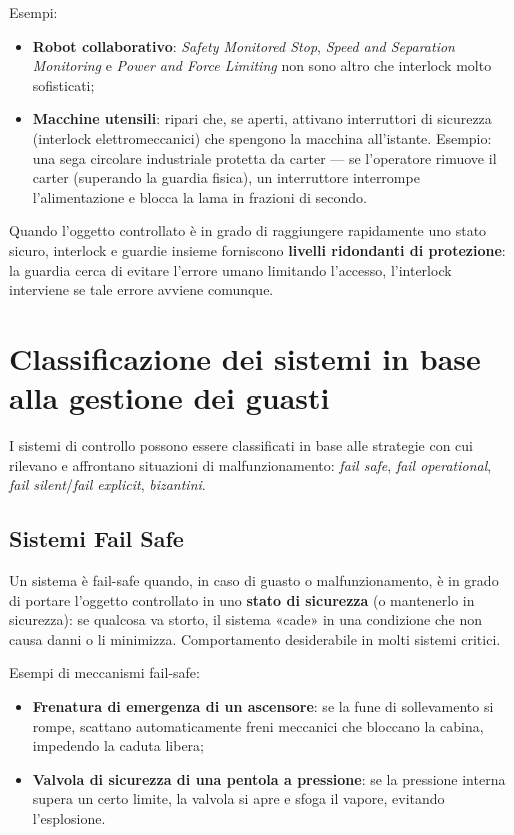 Esempi:
\begin{itemize}
    \item \textbf{Robot collaborativo}: \emph{Safety Monitored Stop}, \emph{Speed and Separation Monitoring} e \emph{Power and Force Limiting} non sono altro che interlock molto sofisticati;
    \item \textbf{Macchine utensili}: ripari che, se aperti, attivano interruttori di sicurezza (interlock elettromeccanici) che spengono la macchina all'istante. Esempio: una sega circolare industriale protetta da carter — se l'operatore rimuove il carter (superando la guardia fisica), un interruttore interrompe l'alimentazione e blocca la lama in frazioni di secondo.
\end{itemize}

Quando l'oggetto controllato è in grado di raggiungere rapidamente uno stato sicuro, interlock e guardie insieme forniscono \textbf{livelli ridondanti di protezione}: la guardia cerca di evitare l'errore umano limitando l'accesso, l'interlock interviene se tale errore avviene comunque.

\section{Classificazione dei sistemi in base alla gestione dei guasti}
I sistemi di controllo possono essere classificati in base alle strategie con cui rilevano e affrontano situazioni di malfunzionamento: \emph{fail safe}, \emph{fail operational}, \emph{fail silent}/\emph{fail explicit}, \emph{bizantini}.

\subsection{Sistemi Fail Safe}
\begin{defn}
Un sistema è fail-safe quando, in caso di guasto o malfunzionamento, è in grado di portare l'oggetto controllato in uno \textbf{stato di sicurezza} (o mantenerlo in sicurezza): se qualcosa va storto, il sistema «cade» in una condizione che non causa danni o li minimizza. Comportamento desiderabile in molti sistemi critici.
\end{defn}

Esempi di meccanismi fail-safe:
\begin{itemize}
    \item \textbf{Frenatura di emergenza di un ascensore}: se la fune di sollevamento si rompe, scattano automaticamente freni meccanici che bloccano la cabina, impedendo la caduta libera;
    \item \textbf{Valvola di sicurezza di una pentola a pressione}: se la pressione interna supera un certo limite, la valvola si apre e sfoga il vapore, evitando l'esplosione.
\end{itemize}

